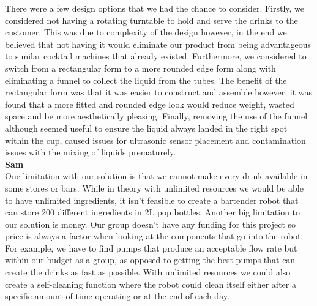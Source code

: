 \documentclass[12pt, titlepage]{article}
\begin{document}
\noindent{}There were a few design options that we had the chance to consider. Firstly, we considered not having a rotating turntable to hold and serve the drinks to the customer. This was due to complexity of the design however, in the end we believed that not having it would eliminate our product from being advantageous to similar cocktail machines that already existed. Furthermore, we considered to switch from a rectangular form to a more rounded edge form along with eliminating a funnel to collect the liquid from the tubes. The benefit of the rectangular form was that it was easier to construct and assemble however, it was found that a more fitted and rounded edge look would reduce weight, wasted space and be more aesthetically pleasing. Finally, removing the use of the funnel although seemed useful to ensure the liquid always landed in the right spot within the cup, caused issues for ultrasonic sensor placement and contamination issues with the mixing of liquids prematurely. \\


\textbf{Sam}\\
One limitation with our solution is that we cannot make every drink available in some stores or bars. While in theory with unlimited resources we would be able to have unlimited ingredients, it isn't feasible to create a bartender robot that can store 200 different ingredients in 2L pop bottles. Another big limitation to our solution is money. Our group doesn't have any funding for this project so price is always a factor when looking at the components that go into the robot. For example, we have to find pumps that produce an acceptable flow rate but within our budget as a group, as opposed to getting the best pumps that can create the drinks as fast as possible. With unlimited resources we could also create a self-cleaning function where the robot could clean itself either after a specific amount of time operating or at the end of each day. \\
\end{document}
